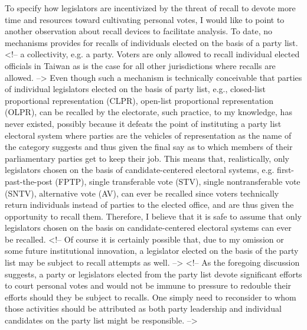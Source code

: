 \documentclass[hyphens, crop=false]{standalone}
\begin{document}
	
		To specify how legislators are incentivized by the threat of recall to devote more time and resources toward cultivating personal votes,
		I would like to point to another observation about recall devices to facilitate analysis.
		To date,
		no mechanisms provides for recalls of individuals elected on the basis of a party list.
		<!-- a collectivity,
		e.g.
		a party.
		Voters are only allowed to recall individual elected officials in Taiwan as is the case for all other jurisdictions where recalls are allowed.
		 --> Even though such a mechanism is technically conceivable that parties of individual legislators elected on the basis of party list,
		e.g.,
		closed-list proportional representation (CLPR),
		open-list proportional representation (OLPR),
		can be recalled by the electorate,
		such practice,
		to my knowledge,
		has never existed,
		possibly because it defeats the point of instituting a party list electoral system where parties are the vehicles of representation as the name of the category suggests and thus given the final say as to which members of their parliamentary parties get to keep their job.
		This means that,
		realistically,
		only legislators chosen on the basis of candidate-centered electoral systems,
		e.g.
		first-past-the-post (FPTP),
		single transferable vote (STV),
		single nontransferable vote (SNTV),
		alternative vote (AV),
		can ever be recalled since voters technically return individuals instead of parties to the elected office,
		and are thus given the opportunity to recall them.
		Therefore,
		I believe that it is safe to assume that only legislators chosen on the basis on candidate-centered electoral systems can ever be recalled.
		<!-- Of course it is certainly possible that,
		due to my omission or some future institutional innovation,
		a legislator elected on the basis of the party list may be subject to recall attempts as well.
		-->
		<!-- As the foregoing discussion suggests,
		 a party or legislators elected from the party list devote significant efforts to court personal votes and would not be immune to pressure to redouble their efforts should they be subject to recalls.
		 One simply need to reconsider to whom those activities should be attributed as both party leadership and individual candidates on the party list might be responsible.
		 -->
	
\end{document}
